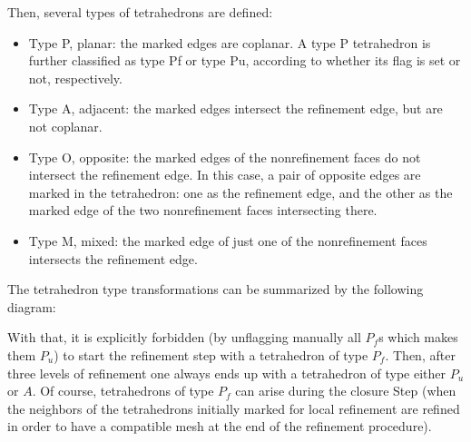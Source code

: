 \documentclass[a4paper,12pt]{amsart}
\numberwithin{equation}{section}
\begin{document}
Then, several types of tetrahedrons are defined:
\begin{itemize}
\item  Type P, planar: the marked edges are coplanar. A type P tetrahedron is further 		classified as type Pf or type Pu, according to whether its flag is set or not, 			respectively.
\item Type A, adjacent: the marked edges intersect the refinement edge, but are
	not coplanar.
\item Type O, opposite: the marked edges of the nonrefinement faces do not intersect 		the refinement edge. In this case, a pair of opposite edges are marked in the 			tetrahedron: one as the refinement edge, and the other as the marked edge of the 		two nonrefinement faces intersecting there.
\item Type M, mixed: the marked edge of just one of the nonrefinement faces
	intersects the refinement edge.
\end{itemize}

The tetrahedron type transformations can be summarized by the following diagram:

\begin{center}
\end{center}
With that, it is explicitly forbidden (by unflagging manually all $P_f$s which makes them $P_u$) to start the refinement step with a tetrahedron of type $P_f$. Then, after three levels of refinement one always ends up with a tetrahedron of type either $P_u$ or $A$. Of course, tetrahedrons of type $P_f$ can arise during the closure Step (when the neighbors of the tetrahedrons initially marked for local refinement are refined in order to have a compatible mesh at the end of the refinement procedure).
\end{document}
